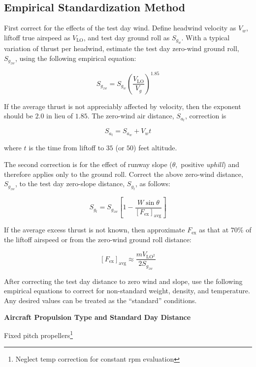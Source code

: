 \documentclass[
]{book}
\begin{document}
\hypertarget{empirical-standardization-method}{%
\subsection{Empirical Standardization Method}\label{empirical-standardization-method}}

First correct for the effects of the test day wind.
Define headwind velocity as \(V_w\), liftoff true airspeed as \(V_{\mathrm{LO}}\), and test day ground roll as \(S_{g_w}\).
With a typical variation of thrust per headwind, estimate the test day zero-wind ground roll, \(S_{g_{zw}}\), using the following empirical equation:

\[
S_{g_{zw}} = S_{g_w} \left( \frac{V_{\mathrm{LO}}}{V_g} \right)^{1.85}
\label{eq:zero-wind-gnd-dist}
\]

If the average thrust is not appreciably affected by velocity, then the exponent should be \(2.0\) in lieu of \(1.85\). The zero-wind air distance, \(S_{a_t}\), correction is

\[
S_{a_t} = S_{a_w} + V_w t
\label{eq:zero-wind-air-dist}
\]

where \(t\) is the time from liftoff to \(35\) (or \(50\)) feet altitude.

The second correction is for the effect of runway slope (\(\theta\),~positive \emph{uphill}) and therefore applies only to the ground roll.
Correct the above zero-wind distance, \(S_{g_{zw}}\), to the test day zero-slope distance, \(S_{g_t}\), as follows:

\[
S_{g_t} = S_{g_{zw}} \left[ 1 - \frac{W \sin \theta}{\left[ F_{\text{ex}} \right]_{\text{avg}}} \right]
\label{eq:zero-slope-air-dist}
\]

If the average excess thrust is not known, then approximate \(F_{\text{ex}}\) as that at \(70\%\) of the liftoff airspeed or from the zero-wind ground roll distance:

\[
\left[ F_{\text{ex}} \right]_{\text{avg}} \approx \frac{m V_{\mathrm{LO}^2}}{2 S_{g_{zw}}}
\label{eq:approx-fex-lo}
\]

After correcting the test day distance to zero wind and slope, use the following empirical equations to correct for non-standard weight, density, and temperature.
Any desired values can be treated as the ``standard'' conditions.

\textbf{Aircraft Propulsion Type and Standard Day Distance}

Fixed pitch propellers\footnote{Neglect temp correction for constant rpm evaluation}
\end{document}

